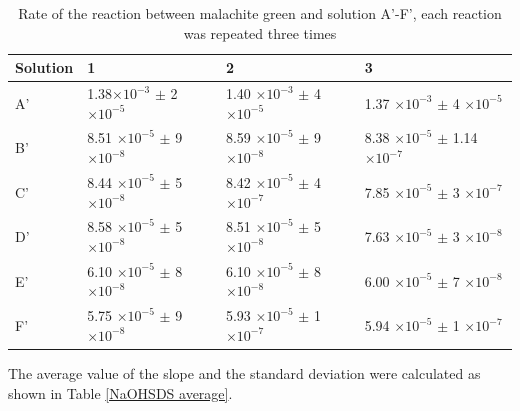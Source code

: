 \documentclass[twocolumn]{article} %
\begin{document}
\begin{table}[h]
    \caption{Rate of the reaction between malachite green and solution A'-F', each reaction was repeated three times}
    \label{RateSDS}
    \begin{tabular}{L{0.3in}C{0.9in}C{0.9in}C{0.9in}}\toprule
        Solution & 1  & 2 & 3  \\\midrule
        A' & 1.38$\times 10^{-3}$ $\pm$ 2 $\times 10^{-5}$ & 1.40 $\times 10^{-3}$ $\pm$ 4 $\times 10^{-5}$  & 1.37 $\times 10^{-3}$ $\pm$ 4 $\times 10^{-5}$   \\
        B' & 8.51 $\times 10^{-5}$ $\pm$ 9 $\times 10^{-8}$ & 8.59 $\times 10^{-5}$ $\pm$ 9 $\times 10^{-8}$  & 8.38 $\times 10^{-5}$ $\pm$ 1.14 $\times 10^{-7}$   \\
        C' & 8.44 $\times 10^{-5}$ $\pm$ 5 $\times 10^{-8}$ & 8.42 $\times 10^{-5}$ $\pm$ 4 $\times 10^{-7}$  & 7.85 $\times 10^{-5}$ $\pm$ 3 $\times 10^{-7}$   \\
        D' & 8.58 $\times 10^{-5}$ $\pm$ 5 $\times 10^{-8}$ & 8.51 $\times 10^{-5}$ $\pm$ 5 $\times 10^{-8}$  & 7.63 $\times 10^{-5}$ $\pm$ 3 $\times 10^{-8}$  \\
        E' & 6.10 $\times 10^{-5}$ $\pm$ 8 $\times 10^{-8}$ & 6.10 $\times 10^{-5}$ $\pm$ 8 $\times 10^{-8}$  & 6.00 $\times 10^{-5}$ $\pm$ 7 $\times 10^{-8}$  \\
        F' & 5.75 $\times 10^{-5}$ $\pm$ 9 $\times 10^{-8}$ & 5.93 $\times 10^{-5}$ $\pm$ 1 $\times 10^{-7}$  & 5.94 $\times 10^{-5}$ $\pm$ 1 $\times 10^{-7}$   \\\bottomrule
   \end{tabular}
\end{table}


The average value of the slope and the standard deviation were calculated as shown in Table \ref{NaOHSDS average}.

\end{document}
